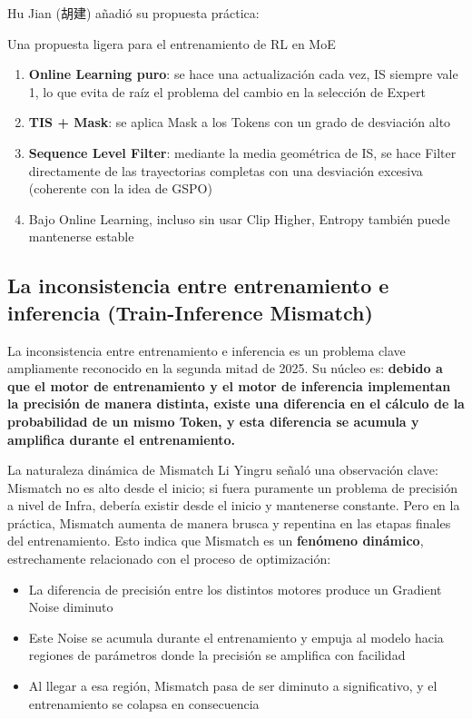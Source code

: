 Hu Jian (胡建) añadió su propuesta práctica:

\begin{importantbox}{Una propuesta ligera para el entrenamiento de RL en MoE}
\begin{enumerate}
    \item \textbf{Online Learning puro}: se hace una actualización cada vez, IS siempre vale 1, lo que evita de raíz el problema del cambio en la selección de Expert
    \item \textbf{TIS + Mask}: se aplica Mask a los Tokens con un grado de desviación alto
    \item \textbf{Sequence Level Filter}: mediante la media geométrica de IS, se hace Filter directamente de las trayectorias completas con una desviación excesiva (coherente con la idea de GSPO)
    \item Bajo Online Learning, incluso sin usar Clip Higher, Entropy también puede mantenerse estable
\end{enumerate}
\end{importantbox}

\subsection{La inconsistencia entre entrenamiento e inferencia (Train-Inference Mismatch)}

La inconsistencia entre entrenamiento e inferencia es un problema clave ampliamente reconocido en la segunda mitad de 2025. Su núcleo es: \textbf{debido a que el motor de entrenamiento y el motor de inferencia implementan la precisión de manera distinta, existe una diferencia en el cálculo de la probabilidad de un mismo Token, y esta diferencia se acumula y amplifica durante el entrenamiento.}

\begin{warningbox}{La naturaleza dinámica de Mismatch}
Li Yingru señaló una observación clave: Mismatch no es alto desde el inicio; si fuera puramente un problema de precisión a nivel de Infra, debería existir desde el inicio y mantenerse constante. Pero en la práctica, Mismatch aumenta de manera brusca y repentina en las etapas finales del entrenamiento. Esto indica que Mismatch es un \textbf{fenómeno dinámico}, estrechamente relacionado con el proceso de optimización:
\begin{itemize}
    \item La diferencia de precisión entre los distintos motores produce un Gradient Noise diminuto
    \item Este Noise se acumula durante el entrenamiento y empuja al modelo hacia regiones de parámetros donde la precisión se amplifica con facilidad
    \item Al llegar a esa región, Mismatch pasa de ser diminuto a significativo, y el entrenamiento se colapsa en consecuencia
\end{itemize}
\end{warningbox}

